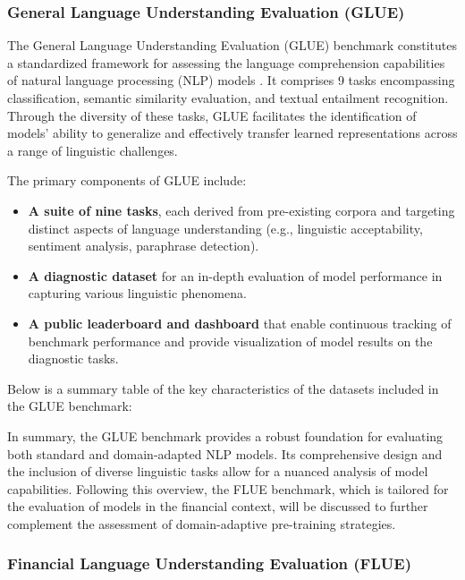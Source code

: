 \sloppy  %

\subsubsection{General Language Understanding Evaluation (GLUE)}

The General Language Understanding Evaluation (GLUE) benchmark constitutes a standardized framework for assessing the language comprehension
capabilities of natural language processing (NLP) models \parencite{wang2018GLUE}. It comprises 9 tasks encompassing classification, semantic
similarity evaluation, and textual entailment recognition. Through the diversity of these tasks, GLUE facilitates the identification
of models’ ability to generalize and effectively transfer learned representations across a range of linguistic challenges.

The primary components of GLUE include:

\begin{itemize}
    \item \textbf{A suite of nine tasks}, each derived from pre-existing corpora and targeting distinct aspects of language
    understanding (e.g., linguistic acceptability, sentiment analysis, paraphrase detection).
    \item \textbf{A diagnostic dataset} for an in-depth evaluation of model performance in capturing various linguistic phenomena.
    \item \textbf{A public leaderboard and dashboard} that enable continuous tracking of benchmark performance and provide
    visualization of model results on the diagnostic tasks.
\end{itemize}

Below is a summary table of the key characteristics of the datasets included in the GLUE benchmark:



In summary, the GLUE benchmark provides a robust foundation for evaluating both standard and domain-adapted NLP models.
Its comprehensive design and the inclusion of diverse linguistic tasks allow for a nuanced analysis of model capabilities.
Following this overview, the FLUE benchmark, which is tailored for the evaluation of models in the financial context,
will be discussed to further complement the assessment of domain-adaptive pre-training strategies.

\subsubsection{Financial Language Understanding Evaluation (FLUE)}

